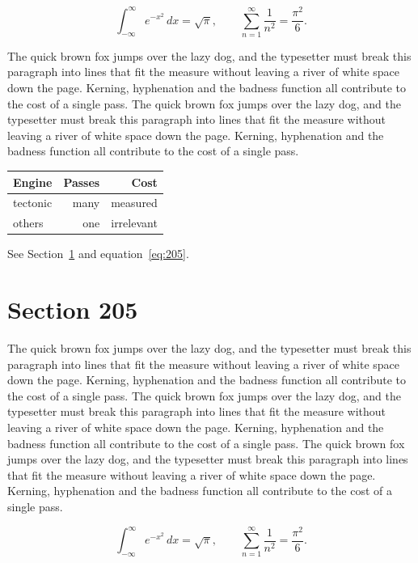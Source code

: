 \documentclass{article}
\begin{document}
\begin{equation}\label{eq:204}
\int_{-\infty}^{\infty} e^{-x^{2}}\,dx = \sqrt{\pi}, \qquad
\sum_{n=1}^{\infty} \frac{1}{n^{2}} = \frac{\pi^{2}}{6}.
\end{equation}

The quick brown fox jumps over the lazy dog, and the typesetter must break this paragraph into lines that fit the measure without leaving a river of white space down the page. Kerning, hyphenation and the badness function all contribute to the cost of a single pass. The quick brown fox jumps over the lazy dog, and the typesetter must break this paragraph into lines that fit the measure without leaving a river of white space down the page. Kerning, hyphenation and the badness function all contribute to the cost of a single pass. 

\begin{center}
\begin{tabular}{lrr}
\toprule
Engine & Passes & Cost \\
\midrule
tectonic & many & measured \\
others & one & irrelevant \\
\bottomrule
\end{tabular}
\end{center}

See Section~\ref{sec:205} and equation~\eqref{eq:205}.
\section{Section 205}
\label{sec:205}
The quick brown fox jumps over the lazy dog, and the typesetter must break this paragraph into lines that fit the measure without leaving a river of white space down the page. Kerning, hyphenation and the badness function all contribute to the cost of a single pass. The quick brown fox jumps over the lazy dog, and the typesetter must break this paragraph into lines that fit the measure without leaving a river of white space down the page. Kerning, hyphenation and the badness function all contribute to the cost of a single pass. The quick brown fox jumps over the lazy dog, and the typesetter must break this paragraph into lines that fit the measure without leaving a river of white space down the page. Kerning, hyphenation and the badness function all contribute to the cost of a single pass. 

\begin{equation}\label{eq:205}
\int_{-\infty}^{\infty} e^{-x^{2}}\,dx = \sqrt{\pi}, \qquad
\sum_{n=1}^{\infty} \frac{1}{n^{2}} = \frac{\pi^{2}}{6}.
\end{equation}
\end{document}
